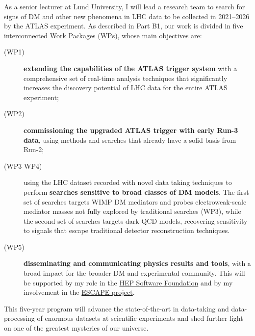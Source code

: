 As a senior lecturer at Lund University, I will lead a research team to search for signs of DM and other new phenomena in LHC data to be collected in 2021--2026 by the ATLAS experiment. 
As described in Part B1, our work is divided in five interconnected Work Packages (WPs), whose main objectives are: 

\begin{description}


\item[(WP1)]  \textbf{extending the capabilities of the ATLAS trigger system} with a comprehensive set of real-time analysis techniques that significantly increases the discovery potential of LHC data for the entire ATLAS experiment;
\item[(WP2)] \textbf{commissioning the upgraded ATLAS trigger with early Run-3 data}, using methods and searches that already have a solid basis from Run-2;
\item[(WP3-WP4)] using the LHC dataset recorded with novel data taking techniques to perform \textbf{searches sensitive to broad classes of DM models}. The first set of searches targets WIMP DM mediators and probes electroweak-scale mediator masses not fully explored by traditional searches (WP3), while the second set of searches targets dark QCD models, recovering sensitivity to signals that escape traditional detector reconstruction techniques.
\item[(WP5)] \textbf{disseminating and communicating physics results and tools}, with a broad impact for the broader DM and experimental community. This will be supported by my role in the \href{https://hepsoftwarefoundation.org}{HEP Software Foundation} and by my involvement in the \href{https://projectescape.eu}{ESCAPE project}.

\end{description}

This five-year program will advance the state-of-the-art in data-taking and data-processing of enormous datasets at scientific experiments and shed further light on one of the greatest mysteries of our universe. 





